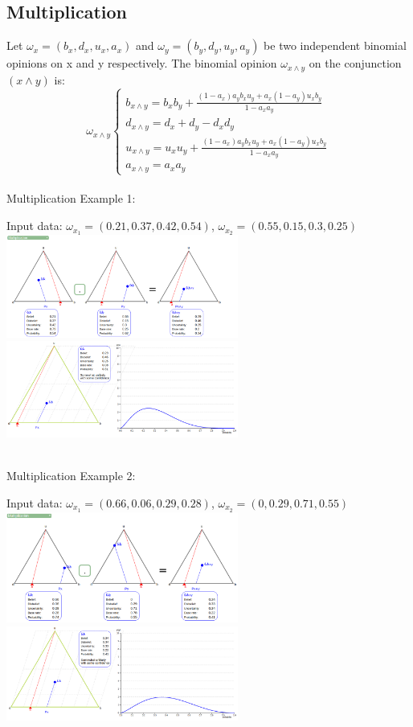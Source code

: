 \documentclass[UTF8]{article}
\newcommand{\opinion}[5]{$\omega_{#1} = (#2, #3, #4, #5)$}
\begin{document}
\subsection{Multiplication}
Let \opinion{x}{b_x}{d_x}{u_x}{a_x} and \opinion{y}{b_y}{d_y}{u_y}{a_y} be two independent binomial opinions on x and y respectively. The binomial opinion $\omega_{x \land y}$ on the conjunction $(x \land y)$ is:
$$
\omega_{x \land y}
\begin{cases}
    b_{x \land y} = b_xb_y+ \frac{(1 - a_x)a_yb_xu_y + a_x(1 - a_y)u_xb_y}{1 - a_xa_y}\\    
    d_{x \land y} = d_x + d_y - d_xd_y\\
    u_{x \land y} = u_xu_y+ \frac{(1 - a_x)a_yb_xu_y + a_x(1 - a_y)u_xb_y}{1 - a_xa_y}\\
    a_{x \land y} = a_xa_y
\end{cases}
$$\\
Multiplication Example 1:\\
\begin{center}
    Input data: 
    \opinion{x_1}{0.21}{0.37}{0.42}{0.54}, 
    \opinion{x_2}{0.55}{0.15}{0.3}{0.25}\\
    \includegraphics[width=3in]{images/mul1.png}
    \includegraphics[width=3in]{images/mul1viz.png}
\end{center}
\hrulefill\\
Multiplication Example 2:
    \begin{center}
        Input data: 
        \opinion{x_1}{0.66}{0.06}{0.29}{0.28}, 
        \opinion{x_2}{0}{0.29}{0.71}{0.55}\\
        \includegraphics[width=3in]{images/mul2.png}
        \includegraphics[width=3in]{images/mul2viz.png}
    \end{center}
\end{document}
